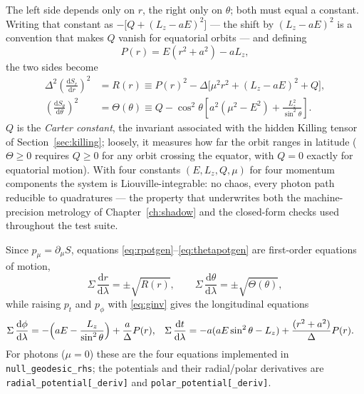 The left side depends only on $r$, the right only on $\theta$; both must
equal a constant. Writing that constant as
$-\bigl[Q + (L_z - aE)^2\bigr]$ — the shift by $(L_z-aE)^2$ is a
convention that makes $Q$ vanish for equatorial orbits — and defining
\begin{equation}
P(r) = E(r^2+a^2) - a L_z,
\label{eq:pofr}
\end{equation}
the two sides become
\begin{align}
\Delta^2\left(\frac{\mathrm{d}S_r}{\mathrm{d}r}\right)^2
&= R(r) \equiv P(r)^2
- \Delta\bigl[\mu^2 r^2 + (L_z-aE)^2 + Q\bigr],
\label{eq:rpotgen}\\
\left(\frac{\mathrm{d}S_\theta}{\mathrm{d}\theta}\right)^2
&= \Theta(\theta) \equiv Q - \cos^2\theta\left[a^2(\mu^2 - E^2) +
\frac{L_z^2}{\sin^2\theta}\right].
\label{eq:thetapotgen}
\end{align}
$Q$ is the \emph{Carter constant}, the invariant associated with the
hidden Killing tensor of Section~\ref{sec:killing}; loosely, it measures
how far the orbit ranges in latitude ($\Theta \geq 0$ requires
$Q \geq 0$ for any orbit crossing the equator, with $Q = 0$ exactly for
equatorial motion). With four constants $(E, L_z, Q, \mu)$ for four
momentum components the system is Liouville-integrable: no chaos, every
photon path reducible to quadratures — the property that underwrites
both the machine-precision metrology of Chapter~\ref{ch:shadow} and the
closed-form checks used throughout the test suite.

Since $p_\mu = \partial_\mu S$, equations
\eqref{eq:rpotgen}--\eqref{eq:thetapotgen} are first-order equations of
motion,
\begin{equation}
\Sigma\,\frac{\mathrm{d}r}{\mathrm{d}\lambda} = \pm\sqrt{R(r)},
\qquad
\Sigma\,\frac{\mathrm{d}\theta}{\mathrm{d}\lambda} =
\pm\sqrt{\Theta(\theta)},
\label{eq:firstorder}
\end{equation}
while raising $p_t$ and $p_\phi$ with \eqref{eq:ginv} gives the
longitudinal equations
\begin{align}
\Sigma\,\frac{\mathrm{d}\phi}{\mathrm{d}\lambda} &=
  -\Bigl(aE - \frac{L_z}{\sin^2\theta}\Bigr) + \frac{a}{\Delta}P(r),
&\Sigma\,\frac{\mathrm{d}t}{\mathrm{d}\lambda} &=
  -a(aE\sin^2\theta - L_z) + \frac{(r^2+a^2)}{\Delta}P(r).
\label{eq:tphi}
\end{align}
For photons ($\mu = 0$) these are the four equations implemented in
\texttt{null\_geodesic\_rhs}; the potentials and their radial/polar
derivatives are \texttt{radial\_potential[\_deriv]} and
\texttt{polar\_potential[\_deriv]}.

